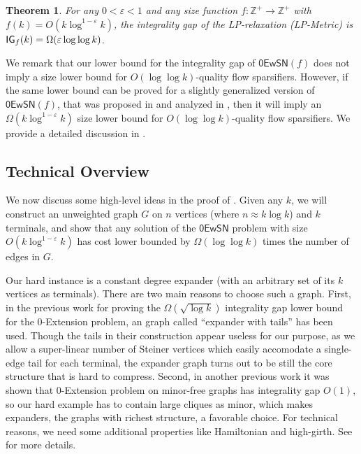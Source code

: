 \documentclass[11pt]{article}
\newtheorem{theorem}{Theorem}[section]
\theoremstyle{definition}
\newcommand{\eps}{{\varepsilon}}
\newcommand{\zesn}{\mathsf{0EwSN}}
\begin{document}
\begin{titlepage}
\begin{theorem}
\label{thm: 0-ext with Steiner lower}
For any $0<\eps<1$ and any size function $f:\mathbb{Z}^+\to \mathbb{Z}^+$ with $f(k)=O(k\log^{1-\eps} k)$, 
the integrality gap of the LP-relaxation (\textnormal{\textsf{LP-Metric}}) is $\textnormal{\textsf{IG}}_f(k)=\Omega(\eps \log\log k)$.
\end{theorem}


We remark that our lower bound for the integrality gap of $\zesn(f)$ does not imply a size lower bound for $O(\log\log k)$-quality flow sparsifiers. However, if the same lower bound can be proved for a slightly generalized version of $\zesn(f)$, that was proposed in \cite{andoni2014towards} and analyzed in \cite{chen20241+}, then it will imply an $\Omega(k\log^{1-\eps} k)$ size lower bound for $O(\log\log k)$-quality flow sparsifiers. We provide a detailed discussion in .

\subsection{Technical Overview}

We now discuss some high-level ideas in the proof of  . Given any $k$, we will construct an unweighted graph $G$ on $n$ vertices (where $n\approx k\log k$) and $k$ terminals, and show that any solution of the $\zesn$ problem with size $O(k\log^{1-\eps} k)$ has cost lower bounded by $\Omega(\log\log k)$ times the number of edges in $G$.

Our hard instance is a constant degree expander (with an arbitrary set of its $k$ vertices as terminals). There are two main reasons to choose such a graph. First, in the previous work \cite{calinescu2005approximation} for proving the $\Omega(\sqrt{\log k})$ integrality gap lower bound for the $0$-Extension problem, an graph called ``expander with tails'' has been used. Though the tails in their construction appear useless for our purpose, as we allow a super-linear number of Steiner vertices which easily accomodate a single-edge tail for each terminal, the expander graph turns out to be still the core structure that is hard to compress.
Second, in another previous work \cite{archer2004approximate} it was shown that $0$-Extension problem on minor-free graphs has integrality gap $O(1)$, so our hard example has to contain large cliques as minor, which makes expanders, the graphs with richest structure,  a favorable choice. For technical reasons, we need some additional properties like Hamiltonian and high-girth. See  for more details.


\end{titlepage}
\end{document}
